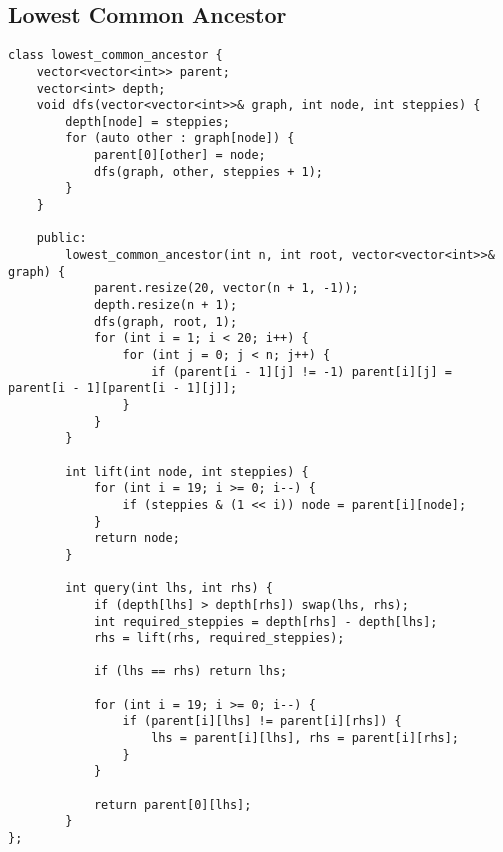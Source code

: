 \subsection{Lowest Common Ancestor}
\begin{lstlisting}
class lowest_common_ancestor {
    vector<vector<int>> parent;
    vector<int> depth;
    void dfs(vector<vector<int>>& graph, int node, int steppies) {
        depth[node] = steppies;
        for (auto other : graph[node]) {
            parent[0][other] = node;
            dfs(graph, other, steppies + 1);
        }
    }

    public:
        lowest_common_ancestor(int n, int root, vector<vector<int>>& graph) {
            parent.resize(20, vector(n + 1, -1));
            depth.resize(n + 1);
            dfs(graph, root, 1);
            for (int i = 1; i < 20; i++) {
                for (int j = 0; j < n; j++) {
                    if (parent[i - 1][j] != -1) parent[i][j] = parent[i - 1][parent[i - 1][j]];
                }
            }
        }

        int lift(int node, int steppies) {
            for (int i = 19; i >= 0; i--) {
                if (steppies & (1 << i)) node = parent[i][node];
            }
            return node;
        }

        int query(int lhs, int rhs) {
            if (depth[lhs] > depth[rhs]) swap(lhs, rhs);
            int required_steppies = depth[rhs] - depth[lhs];
            rhs = lift(rhs, required_steppies);

            if (lhs == rhs) return lhs;

            for (int i = 19; i >= 0; i--) {
                if (parent[i][lhs] != parent[i][rhs]) {
                    lhs = parent[i][lhs], rhs = parent[i][rhs];
                }
            }

            return parent[0][lhs];
        }
};
\end{lstlisting}